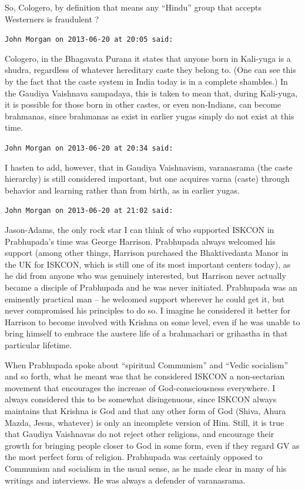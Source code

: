 \begin{footnotesize}
\begin{sffamily}
So, Cologero, by definition that means any ``Hindu'' group that accepts Westerners is fraudulent ?

\hfill

\texttt{John Morgan on 2013-06-20 at 20:05 said:}

Cologero, in the Bhagavata Purana it states that anyone born in Kali-yuga is a shudra, regardless of whatever hereditary caste they belong to. (One can see this by the fact that the caste system in India today is in a complete shambles.) In the Gaudiya Vaishnava sampadaya, this is taken to mean that, during Kali-yuga, it is possible for those born in other castes, or even non-Indians, can become brahmanas, since brahmanas as exist in earlier yugas simply do not exist at this time.

\hfill

\texttt{John Morgan on 2013-06-20 at 20:34 said:}

I hasten to add, however, that in Gaudiya Vaishnavism, varanasrama (the caste hierarchy) is still considered important, but one acquires varna (caste) through behavior and learning rather than from birth, as in earlier yugas.

\hfill

\texttt{John Morgan on 2013-06-20 at 21:02 said:}

Jason-Adams, the only rock star I can think of who supported ISKCON in Prabhupada's time was George Harrison. Prabhupada always welcomed his support (among other things, Harrison purchased the Bhaktivedanta Manor in the UK for ISKCON, which is still one of its most important centers today), as he did from anyone who was genuinely interested, but Harrison never actually became a disciple of Prabhupada and he was never initiated. Prabhupada was an eminently practical man -- he welcomed support wherever he could get it, but never compromised his principles to do so. I imagine he considered it better for Harrison to become involved with Krishna on some level, even if he was unable to bring himself to embrace the austere life of a brahmachari or grihastha in that particular lifetime.

When Prabhupada spoke about ``spiritual Communism'' and ``Vedic socialism'' and so forth, what he meant was that he considered ISKCON a non-sectarian movement that encourages the increase of God-consciousness everywhere. I always considered this to be somewhat disingenuous, since ISKCON always maintains that Krishna is God and that any other form of God (Shiva, Ahura Mazda, Jesus, whatever) is only an incomplete version of Him. Still, it is true that Gaudiya Vaishnavas do not reject other religions, and encourage their growth for bringing people closer to God in some form, even if they regard GV as the most perfect form of religion. Prabhupada was certainly opposed to Communism and socialism in the usual sense, as he made clear in many of his writings and interviews. He was always a defender of varanasrama.


\end{sffamily}
\end{footnotesize}
